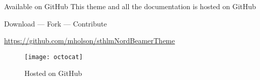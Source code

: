 \documentclass[\string~/GitHub/sthlmNordBeamerTheme/sthlmNordLightDemo.tex]{subfiles}
\begin{document}
\begin{frame}[c]{Available on GitHub}
  This theme and all the documentation is hosted on GitHub \\
  \vspace{1em}
  \begin{center}
	\large{Download --- Fork --- Contribute}

	\url{https://github.com/mholson/sthlmNordBeamerTheme}
	\vspace{1em}

	\begin{figure}
	  \centerline{\texttt{[image: octocat]}}
	  \caption{Hosted on GitHub}
	\end{figure}

  \end{center}
\end{frame}
\end{document}
